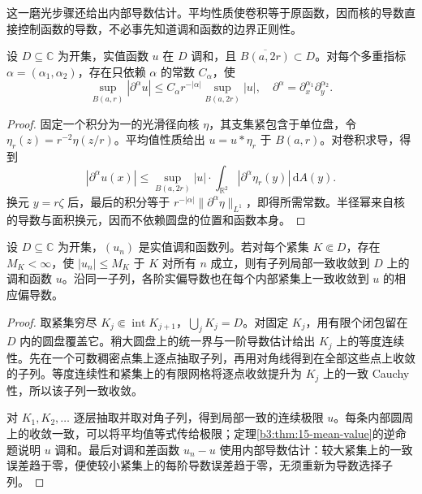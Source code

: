 这一磨光步骤还给出内部导数估计。平均性质使卷积等于原函数，因而核的导数直接控制函数的导数，不必事先知道调和函数的边界正则性。

\begin{proposition}[内部导数估计]\label{b3:prop:15-interior-derivatives}
设 \(D\subseteq\mathbb C\) 为开集，实值函数 \(u\) 在 \(D\) 调和，且 \(\overline{B(a,2r)}\subset D\)。对每个多重指标 \(\alpha=(\alpha_1,\alpha_2)\)，存在只依赖 \(\alpha\) 的常数 \(C_\alpha\)，使
\[
 \sup_{B(a,r)}|\partial^\alpha u|
 \le C_\alpha r^{-|\alpha|}\sup_{B(a,2r)}|u|,
 \quad
 \partial^\alpha=\partial_x^{\alpha_1}\partial_y^{\alpha_2}.
\]
\end{proposition}
\begin{proof}
固定一个积分为一的光滑径向核 \(\eta\)，其支集紧包含于单位盘，令 \(\eta_r(z)=r^{-2}\eta(z/r)\)。平均值性质给出 \(u=u*\eta_r\) 于 \(B(a,r)\)。对卷积求导，得到
\[
 |\partial^\alpha u(x)|
 \le\sup_{B(a,2r)}|u|\cdot
 \int_{\mathbb R^2}|\partial^\alpha\eta_r(y)|\,\mathrm dA(y).
\]
换元 \(y=r\zeta\) 后，最后的积分等于
\(r^{-|\alpha|}\|\partial^\alpha\eta\|_{L^1}\)，即得所需常数。半径幂来自核的导数与面积换元，因而不依赖圆盘的位置和函数本身。
\end{proof}

\begin{corollary}[调和函数族的内部紧性]\label{b3:cor:15-harmonic-compactness}
设 \(D\subseteq\mathbb C\) 为开集，\((u_n)\) 是实值调和函数列。若对每个紧集 \(K\Subset D\)，存在 \(M_K<\infty\)，使 \(|u_n|\le M_K\) 于 \(K\) 对所有 \(n\) 成立，则有子列局部一致收敛到 \(D\) 上的调和函数 \(u\)。沿同一子列，各阶实偏导数也在每个内部紧集上一致收敛到 \(u\) 的相应偏导数。
\end{corollary}
\begin{proof}
取紧集穷尽 \(K_j\Subset\operatorname{int}K_{j+1}\)，\(\bigcup_jK_j=D\)。对固定 \(K_j\)，用有限个闭包留在 \(D\) 内的圆盘覆盖它。稍大圆盘上的统一界与一阶导数估计给出 \(K_j\) 上的等度连续性。先在一个可数稠密点集上逐点抽取子列，再用对角线得到在全部这些点上收敛的子列。等度连续性和紧集上的有限网格将逐点收敛提升为 \(K_j\) 上的一致 Cauchy 性，所以该子列一致收敛。

对 \(K_1,K_2,\ldots\) 逐层抽取并取对角子列，得到局部一致的连续极限 \(u\)。每条内部圆周上的收敛一致，可以将平均值等式传给极限；定理\ref{b3:thm:15-mean-value}的逆命题说明 \(u\) 调和。最后对调和差函数 \(u_n-u\) 使用内部导数估计：较大紧集上的一致误差趋于零，便使较小紧集上的每阶导数误差趋于零，无须重新为导数选择子列。
\end{proof}

